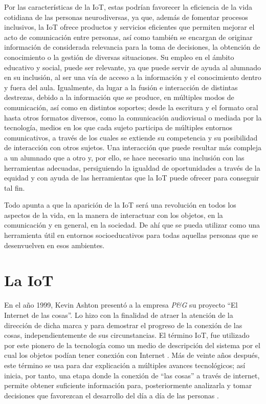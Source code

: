 \documentclass[spanish]{textolivre}
\begin{document}
Por las características de la IoT, estas podrían favorecer la eficiencia de la vida cotidiana de las personas neurodiversas, ya que, además de fomentar procesos inclusivos, la IoT ofrece productos y servicios eficientes que permiten mejorar el acto de comunicación entre personas, así como también se encargan de originar información de considerada relevancia para la toma de decisiones, la obtención de conocimiento o la gestión de diversas situaciones. Su empleo en el ámbito educativo y social, puede ser relevante, ya que puede servir de ayuda al alumnado en su inclusión, al ser una vía de acceso a la información y el conocimiento dentro y fuera del aula. Igualmente, da lugar a la fusión e interacción de distintas destrezas, debido a la información que se produce, en múltiples modos de comunicación, así como en distintos soportes; desde la escritura y el formato oral hasta otros formatos diversos, como la comunicación audiovisual o mediada por la tecnología, medios en los que cada sujeto participa de múltiples entornos comunicativos, a través de los cuales se extiende su competencia y su posibilidad de interacción con otros sujetos. Una interacción que puede resultar más compleja a un alumnado que a otro y, por ello, se hace necesario una inclusión con las herramientas adecuadas, persiguiendo la igualdad de oportunidades a través de la equidad y con ayuda de las herramientas que la IoT puede ofrecer para conseguir tal fin.

Todo apunta a que la aparición de la IoT será una revolución en todos los aspectos de la vida, en la manera de interactuar con los objetos, en la comunicación y en general, en la sociedad. De ahí que se pueda utilizar como una herramienta útil en entornos socioeducativos para todas aquellas personas que se desenvuelven en esos ambientes.

\section{La IoT}

En el año 1999, Kevin Ashton presentó a la empresa \textit{P\&G} su proyecto “El Internet de las cosas”. Lo hizo con la finalidad de atraer la atención de la dirección de dicha marca y  para demostrar el progreso de la conexión de las cosas, independientemente de sus circunstancias. El término IoT, fue utilizado por este pionero de la tecnología como un medio de descripción del sistema por el cual los objetos podían tener conexión con Internet \cite{rose__internet_2015}. Más de veinte años después, este término se usa para dar explicación a múltiples avances tecnológicos; así inicia, por tanto, una etapa donde la conexión de “las cosas” a través de internet, permite obtener suficiente información para, posteriormente analizarla y tomar decisiones que favorezcan el desarrollo del día a día de las personas \cite{pisano_internet_2018}.
\end{document}
